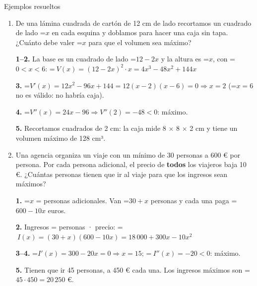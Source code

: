 \documentclass[11pt,a4paper]{article}
\newcommand{\lt}{<}\newcommand{\gt}{>}
\newcommand{\fmm}[1]{\setbox0=\hbox{$#1$}\ifdim\wd0>\linewidth\[#1\]\else\mbox{\box0}\fi}
\begin{document}
\begin{fmex}{Ejemplos resueltos}
\begin{enumerate}[label=\textbf{\arabic*.},leftmargin=*]
            

\textbf{1.} \fmm{x} = lados perpendiculares al río, \fmm{y} = lado paralelo. Valla: \fmm{2x+y=400\Rightarrow y=400-2x}, \fmm{\ 0\lt x\lt200}.

            

\textbf{2.} \fmm{A=x\cdot y\Rightarrow A(x)=x(400-2x)=400x-2x^2}

            

\textbf{3--4.} \fmm{A'(x)=400-4x=0\Rightarrow x=100}; \fmm{\ A''(x)=-4\lt0}: máximo.

            

\textbf{5.} \fmm{x=100} m e \fmm{y=200} m. El área máxima es 20 000 m².
\item De una lámina cuadrada de cartón de 12 cm de lado recortamos un cuadrado de lado \fmm{x} en cada esquina y doblamos para hacer una caja sin tapa. ¿Cuánto debe valer \fmm{x} para que el volumen sea máximo?
          

            

\textbf{1--2.} La base es un cuadrado de lado \fmm{12-2x} y la altura es \fmm{x}, con \fmm{0\lt x\lt6}: \fmm{\ V(x)=(12-2x)^2\cdot x=4x^3-48x^2+144x}

            

\textbf{3.} \fmm{V'(x)=12x^2-96x+144=12(x-2)(x-6)=0\Rightarrow x=2} (\fmm{x=6} no es válido: no habría caja).

            

\textbf{4.} \fmm{V''(x)=24x-96\Rightarrow V''(2)=-48\lt0}: máximo.

            

\textbf{5.} Recortamos cuadrados de 2 cm: la caja mide 8 $\times$ 8 $\times$ 2 cm y tiene un volumen máximo de 128 cm³.
\item Una agencia organiza un viaje con un mínimo de 30 personas a 600 € por persona. Por cada persona adicional, el precio de \textbf{todos} los viajeros baja 10 €. ¿Cuántas personas tienen que ir al viaje para que los ingresos sean máximos?
          

            

\textbf{1.} \fmm{x} = personas adicionales. Van \fmm{30+x} personas y cada una paga \fmm{600-10x} euros.

            

\textbf{2.} Ingresos = personas · precio: \fmm{\ I(x)=(30+x)(600-10x)=18\,000+300x-10x^2}

            

\textbf{3--4.} \fmm{I'(x)=300-20x=0\Rightarrow x=15}; \fmm{\ I''(x)=-20\lt0}: máximo.

            

\textbf{5.} Tienen que ir 45 personas, a 450 € cada una. Los ingresos máximos son \fmm{45\cdot450=20\,250} €.
\end{enumerate}
\end{fmex}

  
\end{document}
